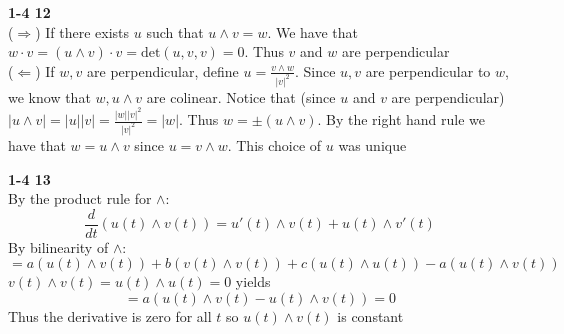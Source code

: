 \documentclass[12pt]{article}
\newenvironment{ques}[1]{\textbf{#1}\vspace{1 mm}\\ }{\bigskip}
\theoremstyle{definition}
\renewcommand{\det}{\text{det}}
\begin{document}
\begin{ques}{1-4 12}
	($\Rightarrow$) If there exists $u$ such that $u \wedge v = w$. We have
	that $w \cdot v = (u \wedge v) \cdot v = \det(u,v,v) = 0$. Thus $v$ and $w$
	are perpendicular\\
	($\Leftarrow$) If $w,v$ are perpendicular, define $u = \frac{v \wedge w}{|v|^2}$.
	Since $u,v$ are perpendicular to $w$, we know that $w, u \wedge v$ are
	colinear. Notice that (since $u$ and $v$ are perpendicular) $|u \wedge v| = |u||v| =
	\frac{|w||v|^2}{|v|^2} = |w|$. Thus $w = \pm (u \wedge v)$. By the right
	hand rule we have that $w = u \wedge v$ since $u = v \wedge w$. This choice
	of $u$ was unique
\end{ques}

\begin{ques}{1-4 13}
	By the product rule for $\wedge$:
	$$\frac d {dt} (u(t) \wedge v(t)) = u'(t) \wedge v(t) + u(t) \wedge v'(t)$$
	By bilinearity of $\wedge$:
	$$= a(u(t) \wedge v(t)) + b(v(t) \wedge v(t)) + c(u(t) \wedge u(t)) -
	a(u(t) \wedge v(t))$$
	$v(t) \wedge v(t) = u(t) \wedge u(t) = 0$ yields
	$$= a(u(t) \wedge v(t) - u(t) \wedge v(t)) = 0$$
	Thus the derivative is zero for all $t$ so $u(t) \wedge v(t)$ is constant
\end{ques}
\end{document}
